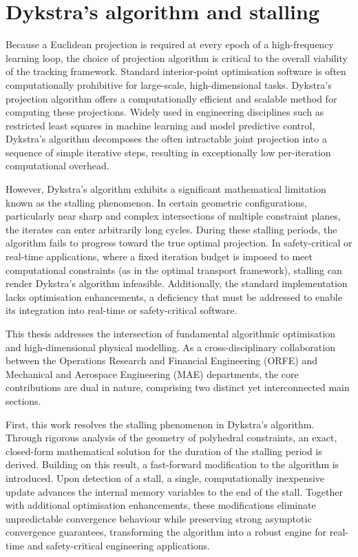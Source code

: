 \section{Dykstra's algorithm and stalling}

Because a Euclidean projection is required at every epoch of a high-frequency learning loop, the choice of projection algorithm is critical to the overall viability of the tracking framework. Standard interior-point optimisation software is often computationally prohibitive for large-scale, high-dimensional tasks. Dykstra's projection algorithm offers a computationally efficient and scalable method for computing these projections. Widely used in engineering disciplines such as restricted least squares in machine learning and model predictive control, Dykstra's algorithm decomposes the often intractable joint projection into a sequence of simple iterative steps, resulting in exceptionally low per-iteration computational overhead.

However, Dykstra's algorithm exhibits a significant mathematical limitation known as the stalling phenomenon. In certain geometric configurations, particularly near sharp and complex intersections of multiple constraint planes, the iterates can enter arbitrarily long cycles. During these stalling periods, the algorithm fails to progress toward the true optimal projection. In safety-critical or real-time applications, where a fixed iteration budget is imposed to meet computational constraints (as in the optimal transport framework), stalling can render Dykstra's algorithm infeasible. Additionally, the standard implementation lacks optimisation enhancements, a deficiency that must be addressed to enable its integration into real-time or safety-critical software.

This thesis addresses the intersection of fundamental algorithmic optimisation and high-dimensional physical modelling. As a cross-disciplinary collaboration between the Operations Research and Financial Engineering (ORFE) and Mechanical and Aerospace Engineering (MAE) departments, the core contributions are dual in nature, comprising two distinct yet interconnected main sections.

First, this work resolves the stalling phenomenon in Dykstra's algorithm. Through rigorous analysis of the geometry of polyhedral constraints, an exact, closed-form mathematical solution for the duration of the stalling period is derived. Building on this result, a fast-forward modification to the algorithm is introduced. Upon detection of a stall, a single, computationally inexpensive update advances the internal memory variables to the end of the stall. Together with additional optimisation enhancements, these modifications eliminate unpredictable convergence behaviour while preserving strong asymptotic convergence guarantees, transforming the algorithm into a robust engine for real-time and safety-critical engineering applications.

